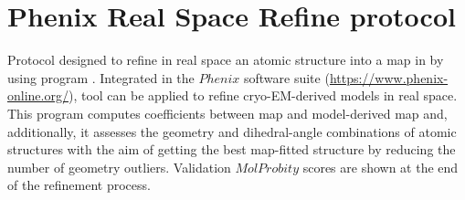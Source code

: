 \section{Phenix Real Space Refine protocol}
\label{app:realSpaceRefineProtocol}%
Protocol designed to refine in real space an atomic structure into a map in \scipion by using  program \citep{afonine2018a}. Integrated in the $Phenix$ software suite (\url{https://www.phenix-online.org/}),  tool can be applied to refine cryo-EM-derived models in real space. This program computes  coefficients between map and model-derived map and, additionally, it assesses the geometry and dihedral-angle combinations of atomic structures with the aim of getting the best map-fitted structure by reducing the number of geometry outliers. Validation $MolProbity$ scores are shown at the end of the refinement process.

